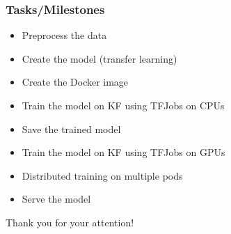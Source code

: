 \documentclass[aspectratio=169]{beamer}
\begin{document}

\begin{frame}
\frametitle{Tasks/Milestones}

\begin{itemize}
	\item Preprocess the data
	\item Create the model (transfer learning)\\
	\item Create the Docker image\\
	\item Train the model on KF using TFJobs on CPUs\\
	\item Save the trained model\\
	\item Train the model on KF using TFJobs on GPUs\\
	\item Distributed training on multiple pods\\
	\item Serve the model
\end{itemize}

\end{frame}


\begin{frame}
\Huge{\centerline{Thank you for your attention!}}\end{frame}
\end{document}
